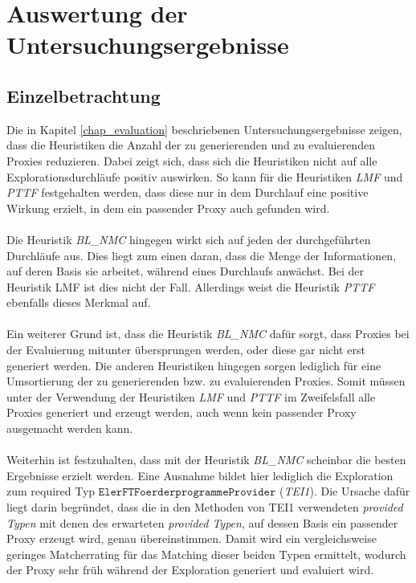 \section{Auswertung der Untersuchungsergebnisse}
\subsection{Einzelbetrachtung}\label{disc_einzel}
Die in Kapitel \ref{chap_evaluation} beschriebenen Untersuchungsergebnisse zeigen, dass die Heuristiken die Anzahl der zu generierenden und zu evaluierenden Proxies reduzieren. Dabei zeigt sich, dass sich die Heuristiken nicht auf alle Explorationsdurchläufe positiv auswirken. So kann für die Heuristiken \emph{LMF} und \emph{PTTF} festgehalten werden, dass diese nur in dem Durchlauf eine positive Wirkung erzielt, in dem ein passender Proxy auch gefunden wird.
\\\\
Die Heuristik \emph{BL\_NMC} hingegen wirkt sich auf jeden der durchgeführten Durchläufe aus. Dies liegt zum einen daran, dass die Menge der Informationen, auf deren Basis sie arbeitet, während eines Durchlaufs anwächst. Bei der Heuristik LMF ist dies nicht der Fall. Allerdings weist die Heuristik \emph{PTTF} ebenfalls dieses Merkmal auf.
\\\\
Ein weiterer Grund ist, dass die Heuristik \emph{BL\_NMC} dafür sorgt, dass Proxies bei der Evaluierung mitunter übersprungen werden, oder diese gar nicht erst generiert werden. Die anderen Heuristiken hingegen sorgen lediglich für eine Umsortierung der zu generierenden bzw. zu evaluierenden Proxies. Somit müssen unter der Verwendung der Heuristiken \emph{LMF} und \emph{PTTF} im Zweifelsfall alle Proxies generiert und erzeugt werden, auch wenn kein passender Proxy ausgemacht werden kann.
\\\\
Weiterhin ist festzuhalten, dass mit der Heuristik \emph{BL\_NMC} scheinbar die besten Ergebnisse erzielt werden. Eine Ausnahme bildet hier lediglich die Exploration zum required Typ $\texttt{ElerFTFoerderprogrammeProvider}$ (\emph{TEI1}). Die Ursache dafür liegt darin begründet, dass die in den Methoden von TEI1 verwendeten \emph{provided Typen} mit denen des erwarteten \emph{provided Typen}, auf dessen Basis ein passender Proxy erzeugt wird, genau übereinstimmen. Damit wird ein vergleichsweise geringes Matcherrating für das Matching dieser beiden Typen ermittelt, wodurch der Proxy sehr früh während der Exploration generiert und evaluiert wird.
